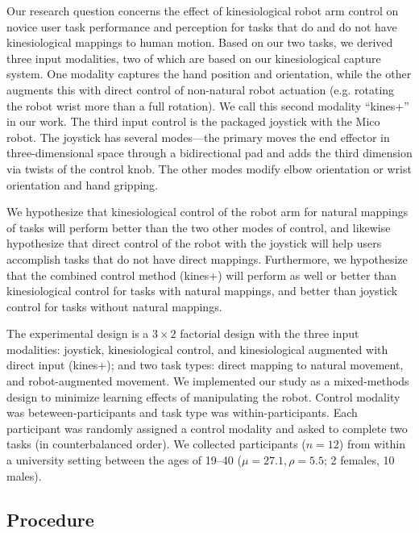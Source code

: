\documentclass{sigchi}
\begin{document}
Our research question concerns the effect of kinesiological robot arm control on novice user task performance and perception for tasks that do and do not have kinesiological mappings to human motion.  Based on our two tasks, we derived three input modalities, two of which are based on our kinesiological capture system.  One modality captures the hand position and orientation, while the other augments this with direct control of non-natural robot actuation (e.g. rotating the robot wrist more than a full rotation).  We call this second modality ``kines+'' in our work. The third input control is the packaged joystick with the Mico robot.  The joystick has several modes---the primary moves the end effector in three-dimensional space through a bidirectional pad and adds the third dimension via twists of the control knob.  The other modes modify elbow orientation or wrist orientation and hand gripping.  

We hypothesize that kinesiological control of the robot arm for natural mappings of tasks will perform better than the two other modes of control, and likewise hypothesize that direct control of the robot with the joystick will help users accomplish tasks that do not have direct mappings. Furthermore, we hypothesize that the combined control method (kines+) will perform as well or better than kinesiological control for tasks with natural mappings, and better than joystick control for tasks without natural mappings.

The experimental design is a $3\times2$ factorial design with the three input modalities: joystick, kinesiological control, and kinesiological augmented with direct input (kines+); and two task types: direct mapping to natural movement, and robot-augmented movement.  We implemented our study as a mixed-methods design to minimize learning effects of manipulating the robot. Control modality was beteween-participants and task type was within-participants. Each participant was randomly assigned a control modality and asked to complete two tasks (in counterbalanced order).  We collected participants ($n=12$) from within a university setting between the ages of 19--40 ($\mu = 27.1, \rho = 5.5$; 2 females, 10 males).


\subsection{Procedure}
\end{document}
